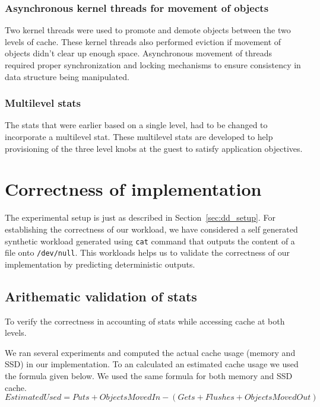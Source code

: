	    
      \subsubsection{Asynchronous kernel threads for movement of objects}
	Two kernel threads were used to promote and demote objects between the two levels of cache. These kernel threads also
	performed eviction if movement of objects didn't clear up enough space. Asynchronous movement of threads required 
	proper synchronization and locking mechanisms to ensure consistency in data structure being manipulated. 
      
      \subsubsection{Multilevel stats}
	The stats that were earlier based on a single level, had to be changed to incorporate a multilevel stat. These 
	multilevel stats are developed to help provisioning of the three level knobs at the guest to satisfy application
	objectives.
  
  \section{Correctness of implementation}
  
      The experimental setup is just as described in Section~\ref{sec:dd_setup}.
      For establishing the correctness of our workload, we have considered a self 
      generated synthetic workload generated using \texttt{cat} command that 
      outputs the content of a file onto \texttt{/dev/null}. This workloads helps 
      us to validate the correctness of our implementation by predicting deterministic
      outputs.
  
    \subsection{Arithematic validation of stats}
    
	    To verify the correctness in accounting of stats while accessing cache at both levels.
	    
	We ran several experiments and computed the actual cache usage (memory and SSD) in our implementation. To an calculated 
	an estimated cache usage we used the formula given below. We used the same formula for both memory and SSD cache. 
	  \begin{equation}
	    EstimatedUsed = Puts + ObjectsMovedIn - (Gets + Flushes + ObjectsMovedOut)
	  \end{equation}
      
